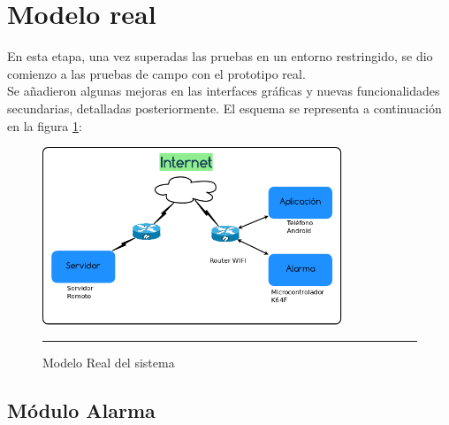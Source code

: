 
\section{Modelo real}

En esta etapa, una vez superadas las pruebas en un entorno restringido, se dio comienzo a las pruebas de campo con el prototipo real.\\
Se añadieron algunas mejoras en las interfaces gráficas y nuevas funcionalidades secundarias, detalladas posteriormente.
El esquema se representa a continuación en la figura \ref{Diagrama_real}:\\	

\begin{figure}[htbp]
	\centering
		\includegraphics[width=0.8\textwidth]{Figures/Diagrama_real.png}
		\rule{35em}{1.5pt}
	\caption[Modelo Real del sistema]{Modelo Real del sistema}
\label{Diagrama_real}
\end{figure}

\newpage


\subsection{Módulo Alarma}

